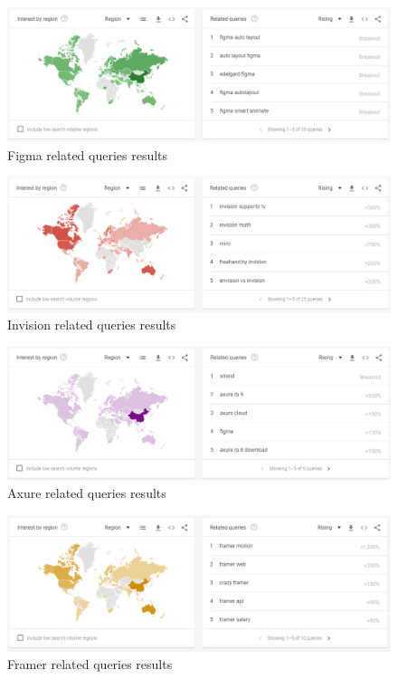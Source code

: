     \begin{figure}[H]
        \centering
        \includegraphics[scale=0.4]{figures/trends/figma-queries.png}
        \caption{Figma related queries results}
        \label{app:google-trends-queries-figma}
    \end{figure}
    
    \begin{figure}[H]
        \centering
        \includegraphics[scale=0.4]{figures/trends/invision-queries.png}
        \caption{Invision related queries results}
        \label{app:google-trends-queries-invision}
    \end{figure}
    
    \begin{figure}[H]
        \centering
        \includegraphics[scale=0.4]{figures/trends/axure-queries.png}
        \caption{Axure related queries results}
        \label{app:google-trends-queries-axure}
    \end{figure}
    
     \begin{figure}[H]
        \centering
        \includegraphics[scale=0.4]{figures/trends/framer-queries.png}
        \caption{Framer related queries results}
        \label{app:google-trends-queries-framer}
    \end{figure}
    